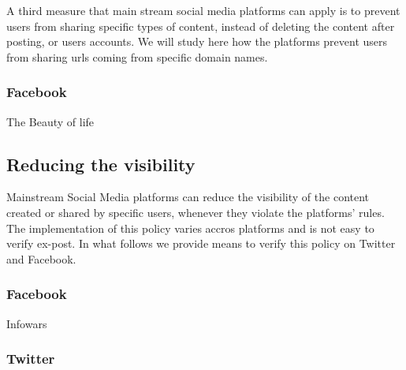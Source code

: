 \documentclass[11pt,a4paper]{article}
\begin{document}
A third measure that main stream social media platforms can apply is to prevent users from sharing specific types of content, instead of deleting the content after posting, or users accounts. We will study here how the platforms prevent users from sharing urls coming from specific domain names.

\subsubsection{Facebook}

The Beauty of life

\subsection{Reducing the visibility}

Mainstream Social Media platforms can reduce the visibility of the content created or shared by specific users, whenever they violate the platforms' rules. The implementation of this policy varies accros platforms and is not easy to verify ex-post. In what follows we provide means to verify this policy on Twitter and Facebook.  

\subsubsection{Facebook}

Infowars 

\subsubsection{Twitter} 



%
%
\end{document}
